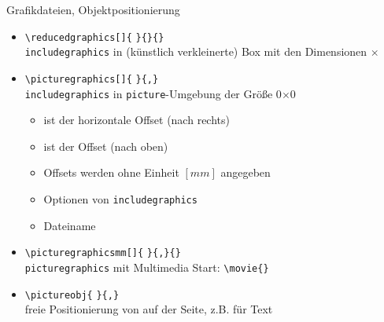 \documentclass[usepdftitle=false, t]{beamer}
\begin{document}
\begin{frame}
\framebreak
  Grafikdateien, Objektpositionierung
  \begin{itemize}
  \item \verb+\reducedgraphics[+\verb+]{+%
	\verb+}{+\verb+}{+\verb+}+\\
	\texttt{includegraphics} in (künstlich verkleinerte) Box mit den
	Dimensionen $\times$
  \item \verb+\picturegraphics[+\verb+]{+%
	\verb+}{+\verb+,+\verb+}+\\
	\texttt{includegraphics} in \texttt{picture}-Umgebung der Größe
	0$\times$0
	\begin{itemize}
	\item {} ist der horizontale Offset (nach rechts)
	\item {} ist der 
		Offset (nach oben)
	\item Offsets werden ohne Einheit $[mm]$ angegeben
	\item {} Optionen von \texttt{includegraphics}
	\item {} Dateiname
	\end{itemize}
  \item \verb+\picturegraphicsmm[+\verb+]{+%
	\verb+}{+\verb+,+\verb+}{+\verb+}+\\
	\texttt{picturegraphics} mit Multimedia Start:
	{\small\verb+\movie{+\verb+}+}
  \item \verb+\pictureobj{+%
        \verb+}{+\verb+,+\verb+}+\\
	freie Positionierung von  auf der Seite,
	z.B. für Text
  \end{itemize}
\end{frame}

\end{document}
